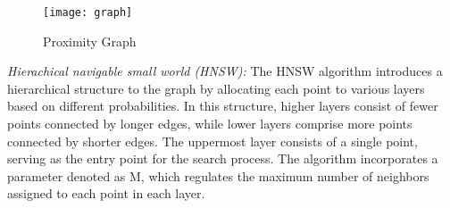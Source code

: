 \documentclass[conference]{IEEEtran}
\begin{document}
\begin{figure}[h!]
  \centering
  \texttt{[image: graph]}
  \caption{Proximity Graph}
  \label{fig: Proximity Graph }
\end{figure}


\textit{Hierachical navigable small world (HNSW):} The HNSW algorithm introduces a hierarchical structure to the graph by allocating each point to various layers based on different probabilities. In this structure, higher layers consist of fewer points connected by longer edges, while lower layers comprise more points connected by shorter edges. The uppermost layer consists of a single point, serving as the entry point for the search process. The algorithm incorporates a parameter denoted as M, which regulates the maximum number of neighbors assigned to each point in each layer.
\end{document}
